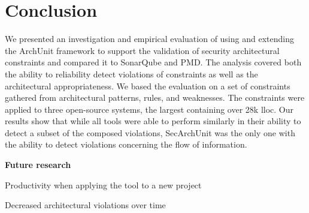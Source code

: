 \chapter{Conclusion}
We presented an investigation and empirical evaluation of using and extending the ArchUnit framework to support the validation of security architectural constraints and compared it to SonarQube and PMD. The analysis covered both the ability to reliability detect violations of constraints as well as the architectural appropriateness. We based the evaluation on a set of constraints gathered from architectural patterns, rules, and weaknesses. The constraints were applied to three open-source systems, the largest containing over 28k lloc. Our results show that while all tools were able to perform similarly in their ability to detect a subset of the composed violations, SecArchUnit was the only one with the ability to detect violations concerning the flow of information.  

\textbf{Future research}

Productivity when applying the tool to a new project

Decreased architectural violations over time


